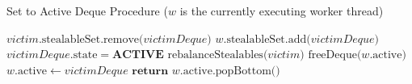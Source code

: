 \documentclass[bsc,frontabs,singlespacing,parskip,deptreport,normalheadings]{infthesis}
\begin{document}
\begin{algorithm}
\caption{Set to Active Deque Procedure ($w$ is the currently executing worker thread)}\label{alg:steal}
\begin{algorithmic}[1]
        \State $ victim \text{.stealableSet.remove(} victimDeque \text{)} $
        \State $ w \text{.stealableSet.add(} victimDeque \text{)} $
        \State $ victimDeque \text{.state} = \textbf{ACTIVE} $
        \State $ \text{rebalanceStealables(} victim \text{)} $
            \label{line:rebalance_2}
            \State $ \text{freeDeque(} w \text{.active)} $
        \EndIf
        \State $ w \text{.active} \gets victimDeque $
        \State $ \textbf{return } w \text{.active.popBottom()} $
    \EndFunction
\end{algorithmic}
\end{algorithm}

\end{document}
